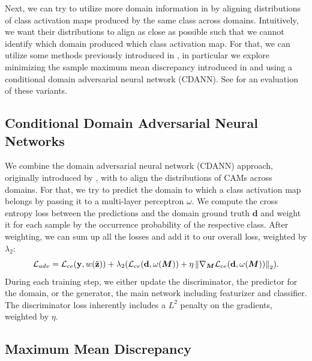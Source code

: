 Next, we can try to utilize more domain information in \divcam by aligning distributions of class activation maps produced by the same class across domains. Intuitively, we want their distributions to align as close as possible such that we cannot identify which domain produced which class activation map. For that, we can utilize some methods previously introduced in , in particular we explore minimizing the sample maximum mean discrepancy introduced in  and using a conditional domain adversarial neural network (CDANN). See  for an evaluation of these variants.

\subsection{Conditional Domain Adversarial Neural Networks}
We combine the domain adversarial neural network (CDANN) approach, originally introduced by \citet{LiGTLT18}, with \divcam to align the distributions of CAMs across domains. For that, we try to predict the domain to which a class activation map belongs by passing it to a multi-layer perceptron $\omega$. We compute the cross entropy loss between the predictions and the domain ground truth $\mathbf{d}$ and weight it for each sample by the occurrence probability of the respective class.
After weighting, we can sum up all the losses and add it to our overall loss, weighted by $\lambda_2$:
\begin{equation}
\label{eq:adv}
\mathcal{L}_{adv} =\mathcal{L}_{ce}(\mathbf{y}, w(\Tilde{\mathbf{z}}))+\lambda_2 ( \mathcal{L}_{ce}(\mathbf{d}, \omega(\boldsymbol{M})) + \eta \left\|\nabla_{\boldsymbol{M}} \mathcal{L}_{ce}(\mathbf{d}, \omega(\boldsymbol{M}))\right\|_2).
\end{equation}
During each training step, we either update the discriminator, \ie the predictor for the domain, or the generator, \ie the main network including featurizer and classifier. The discriminator loss inherently includes a $L^2$ penalty on the gradients, weighted by $\eta$.


\subsection{Maximum Mean Discrepancy}

